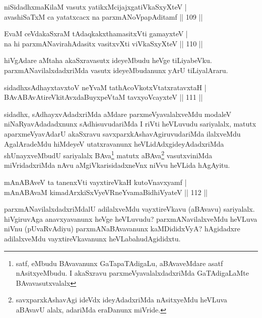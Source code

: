 \begin{shl}
niSidadhxmaKilaM vasutx yatikxMcijajxgatiVkaSxyXteV |\\
avashiSaTxM ca yatatxcacx na parxmANoVpapAditamf \hfill || 109 ||
\end{shl}

\begin{shl}
EvaM ceVdakaSxraM tAdaqkakxthamasitxVti gamayxteV |\\
na hi parxmANavirahAdasitx vasitxvXti viVkaSxyXteV \hfill || 110 ||
\end{shl}

\begin{artha}
hiVgAdare aMtaha akaSxravasutx ideyeMbudu heVge tiLiyabeVku. parxmANavilalxdadxriMda vasutx ideyeMbudanunx yArU tiLiyalAraru.
\end{artha}

\begin{shl}
sidadhxsAdhayxtavxtoV neYvaM tathAcoVkotxVtatxratavxtaH |\\
BAvABAvAtireVkitAvxdaBuyxpeVtaM tavxyoVcayxteV \hfill || 111 ||
\end{shl}

\begin{artha}
sidadhx, sAdhayxvAdadxriMda aMdare parxmeVyavalalxveMdu modaleV niNaRyavAdadadxnunx sAdhisuvudariMda I riVti heVLuvudu sariyalalx, matutx aparxmeVyavAdarU akaSxravu savxparxkAshavAgiruvudariMda ilalxveMdu AgalAradeMdu hiMdeyeV utatxravanunx heVLidAdxgideyAdadxriMda shUnayxveMbudU sariyalalx BAva\footnote{satf, eMbudu BAvavanunx GaTapaTAdigaLu, aBAvaveMdare asatf nAsitxyeMbudu. I akaSxravu parxmeVyavalalxdadxriMda GaTAdigaLaMte BAvavasutxvalalx} matutx aBAva\footnote{savxparxkAshavAgi ideVdx ideyAdadxriMda nAsitxyeMdu heVLuva aBAvavU alalx, adariMda eraDanunx miVride.} vasutxviniMda  miVridadxriMda nAvu aMgiVkarisidadxneVnx niVvu heVLida hAgAyitu.
\end{artha}%

\begin{shl}
mAnABAveV ta tanenxVti vayxtireVkaH kutoV\s navxyamf |\\
mAnABAvaM kimadArxkiSxVyeVRneYvamaBidhiVyateV \hfill || 112 ||
\end{shl}

\begin{artha}
parxmANavilalxdadxriMdalU adilalxveMdu vayxtireVkavu (aBAvavu) sariyalalx. hiVgiruvAga anavxyavanunx heVge heVLuvudu? parxmANavilalxveMdu heVLuva niVnu (pUvaRvAdiyu) parxmANaBAvavanunx kaMDididxVyA? hAgidadxre adilalxveMdu vayxtireVkavanunx heVLabahudAgididxtu.
\end{artha}

